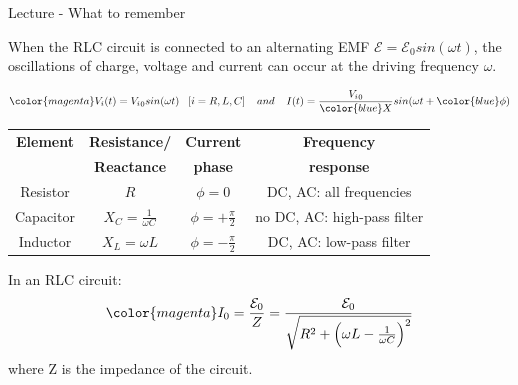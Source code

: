 %
%
%

\begin{frame}{Lecture \thislecture - What to remember}

{\small

When the RLC circuit is connected to an alternating EMF
$\mathcal{E} = \mathcal{E}_0 sin(\omega t)$, the oscillations of
charge, voltage and current can occur at the driving frequency $\omega$.\\

\vspace{0.2cm}

\begin{equation*}
{\color{magenta}
     V_i(t) = {V_i}_0 sin(\omega t) \;\;\; [i=R,L,C]
     \;\;\;\; and \;\;\;\;
     I(t) = \frac{{V_i}_0}{ {\color{blue}X}} sin(\omega t + {\color{blue}\phi})
}
\end{equation*}

 \begin{center}
 {
  \begin{table}[H]
    \begin{tabular}{|c|c|c|c|}
      \hline
        {\bf Element} & {\bf Resistance/} & {\bf Current} & {\bf Frequency} \\
                      & {\bf Reactance}   & {\bf phase}    & {\bf response} \\
      \hline
        Resistor   &
             $\displaystyle R$   &
             $\displaystyle \phi = 0$  &
             DC, AC: all frequencies \\
        Capacitor  &
             $\displaystyle X_C = \frac{1}{\omega C}$   &
             $\displaystyle \phi = +\frac{\pi}{2}$   &
             no DC, AC: high-pass filter \\
        Inductor   &
             $\displaystyle X_L = \omega L$  &
             $\displaystyle \phi = -\frac{\pi}{2}$  &
             DC, AC: low-pass filter \\
      \hline
    \end{tabular}
  \end{table}

 }
 \end{center}

In an RLC circuit:
\begin{equation*}
{\color{magenta}
        I_0 = \frac{\mathcal{E}_0}{Z} =
                 \frac{\mathcal{E}_0}{\sqrt{R^2 + \Big( \omega L - \frac{1}{\omega C} \Big)^2}}
}
\end{equation*}
where Z is the impedance of the circuit.
}
\end{frame}


%
%

\renewcommand{\lecturesummarytitle}{Main points to remember }

